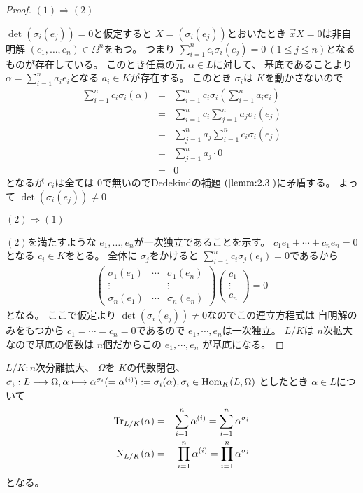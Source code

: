 \documentclass[../master_galois_theory]{subfiles}
\begin{document}
\begin{proof}
  $(1) \Rightarrow (2)$

  $\det(\sigma_i(e_j)) = 0$と仮定すると $X = (\sigma_i(e_j))$とおいたとき $\vec{x} X = 0$は非自明解 $(c_1 , \dots , c_n) \in \Omega^n$をもつ。
  つまり $\sum_{i=1}^n c_i \sigma_i(e_j) = 0 \  (1 \leq j \leq n)$となるものが存在している。
  このとき任意の元 $\alpha \in L$に対して、
  基底であることより $\alpha = \sum_{i=1}^n a_i e_i$となる
  $a_i \in K$が存在する。
  このとき $\sigma_i$は $K$を動かさないので
  \begin{eqnarray*}
    \sum_{i=1}^n c_i \sigma_i(\alpha) & = & \sum_{i=1}^n c_i \sigma_i \left( \sum_{i=1}^n a_i e_i \right) \\
    & = & \sum_{i=1}^n c_i \sum_{j=1}^n a_j \sigma_i (e_j) \\
    & = & \sum_{j=1}^n a_j \sum_{i=1}^n c_i \sigma_i (e_j) \\
    & = & \sum_{j=1}^n a_j \cdot 0 \\
    & = & 0
 \end{eqnarray*}
 となるが $c_i$は全ては $0$で無いので\rm{Dedekind}の補題
 $(\mathrm{\ref{lemm:2.3}})$に矛盾する。
 よって $\det(\sigma_i(e_j)) \neq 0$

 $(2) \Rightarrow (1)$

 $(2)$を満たすような $e_1 , \dots , e_n$が一次独立であることを示す。
 $c_1 e_1 + \cdots + c_n e_n = 0$となる $c_i \in K$をとる。
 全体に $\sigma_j$をかけると
 $\sum_{i=1}^n c_i \sigma_j (e_i) = 0$であるから
 \begin{eqnarray*}
   \begin{pmatrix}
     \sigma_1 (e_1) & \cdots & \sigma_1 (e_n) \\
     \vdots         &        & \vdots         \\
     \sigma_n (e_1) & \cdots & \sigma_n (e_n)
   \end{pmatrix}
   \begin{pmatrix}
     c_1 \\
     \vdots \\
     c_n
   \end{pmatrix}
   = 0
 \end{eqnarray*}
 となる。
 ここで仮定より $\det(\sigma_i(e_j)) \neq 0$なのでこの連立方程式は
 自明解のみをもつから $c_1 = \cdots = c_n = 0$であるので
 $e_1 , \cdots , e_n$は一次独立。
 $L/K$は $n$次拡大なので基底の個数は $n$個だからこの $e_1 , \cdots , e_n$
 が基底になる。
\end{proof}

\begin{prop} \label{prop:2.61}
  $L/K:n$次分離拡大、 $\Omega$を $K$の代数閉包、
  $\sigma_i : L \longrightarrow \Omega , \alpha \longmapsto \alpha^{\sigma_i} (= \alpha^{(i)}) := \sigma_i(\alpha) , \sigma_i \in \mathrm{Hom}_K(L,\Omega)$
  としたとき $\alpha \in L$について
  \begin{eqnarray*}
    \mathrm{Tr}_{L/K}(\alpha) & = & \sum_{i=1}^n \alpha^{(i)} = \sum_{i=1}^n \alpha^{\sigma_i} \\
    \mathrm{N}_{L/K}(\alpha) & = & \prod_{i=1}^n \alpha^{(i)} = \prod_{i=1}^n \alpha^{\sigma_i}
  \end{eqnarray*}
  となる。
\end{prop}
\end{document}
